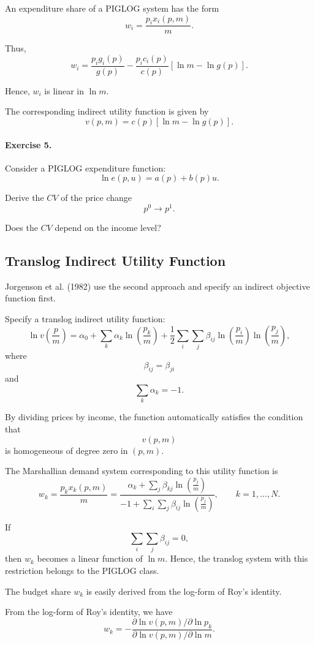 An expenditure share of a PIGLOG system has the form
\[
w_i
=
\frac{p_i x_i(p,m)}{m}.
\]

Thus,
\[
w_i
=
\frac{p_i g_i(p)}{g(p)}
-
\frac{p_i c_i(p)}{c(p)}
\left[
\ln m-\ln g(p)
\right].
\]

Hence, \(w_i\) is linear in \(\ln m\).

The corresponding indirect utility function is given by
\[
v(p,m)
=
c(p)\left[
\ln m-\ln g(p)
\right].
\]

\paragraph{Exercise 5.}
Consider a PIGLOG expenditure function:
\[
\ln e(p,u)
=
a(p)+b(p)u.
\]

Derive the \(CV\) of the price change
\[
p^0\to p^1.
\]

Does the \(CV\) depend on the income level?

\subsection{Translog Indirect Utility Function}

Jorgenson et al. (1982) use the second approach and specify an indirect objective function first.

Specify a translog indirect utility function:
\[
\ln v\left(\frac{p}{m}\right)
=
\alpha_0
+
\sum_k \alpha_k
\ln\left(\frac{p_k}{m}\right)
+
\frac{1}{2}
\sum_i\sum_j
\beta_{ij}
\ln\left(\frac{p_i}{m}\right)
\ln\left(\frac{p_j}{m}\right),
\]
where
\[
\beta_{ij}=\beta_{ji}
\]
and
\[
\sum_k \alpha_k=-1.
\]

By dividing prices by income, the function automatically satisfies the condition that
\[
v(p,m)
\]
is homogeneous of degree zero in \((p,m)\).

The Marshallian demand system corresponding to this utility function is
\[
w_k
=
\frac{p_kx_k(p,m)}{m}
=
\frac{
\alpha_k
+
\sum_j
\beta_{kj}
\ln\left(\frac{p_j}{m}\right)
}{
-1
+
\sum_i\sum_j
\beta_{ij}
\ln\left(\frac{p_j}{m}\right)
},
\qquad
k=1,\dots,N.
\]

If
\[
\sum_i\sum_j \beta_{ij}=0,
\]
then \(w_k\) becomes a linear function of \(\ln m\). Hence, the translog system with this restriction belongs to the PIGLOG class.

The budget share \(w_k\) is easily derived from the log-form of Roy's identity.




From the log-form of Roy's identity, we have
\[
w_k
=
-
\frac{
\partial \ln v(p,m)/\partial \ln p_k
}{
\partial \ln v(p,m)/\partial \ln m
}.
\]

